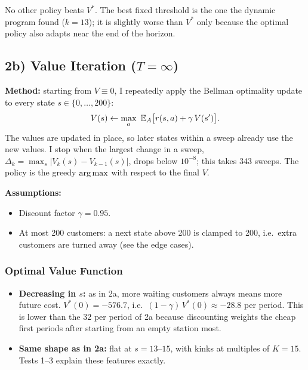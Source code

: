 
No other policy beats $V^*$. The best fixed threshold is the one the dynamic program found ($k = 13$); it is slightly worse than $V^*$ only because the optimal policy also adapts near the end of the horizon.

\FloatBarrier
\subsection{\texorpdfstring{2b) Value Iteration ($T = \infty$)}{2b) Value Iteration (infinite horizon)}}

\textbf{Method:} starting from $V \equiv 0$, I repeatedly apply the Bellman optimality update to every state $s \in \{0, \dots, 200\}$:
\[
  V(s) \leftarrow \max_{a}\ \mathbb{E}_{A}\big[r(s, a) + \gamma\,V(s')\big].
\]
The values are updated in place, so later states within a sweep already use the new values. I stop when the largest change in a sweep, $\Delta_k = \max_s |V_k(s) - V_{k-1}(s)|$, drops below $10^{-8}$; this takes 343 sweeps. The policy is the greedy $\operatorname*{arg\,max}$ with respect to the final $V$.

\textbf{Assumptions:}
\begin{itemize}
  \item Discount factor $\gamma = 0.95$.
  \item At most 200 customers: a next state above 200 is clamped to 200, i.e.\ extra customers are turned away (see the edge cases).
\end{itemize}

\subsubsection{Optimal Value Function}


\begin{itemize}
  \item \textbf{Decreasing in $s$:} as in 2a, more waiting customers always means more future cost. $V^*(0) = -576.7$, i.e.\ $(1 - \gamma)\,V^*(0) \approx -28.8$ per period. This is lower than the 32 per period of 2a because discounting weights the cheap first periods after starting from an empty station most.
  \item \textbf{Same shape as in 2a:} flat at $s = 13$--$15$, with kinks at multiples of $K = 15$. Tests 1--3 explain these features exactly.
\end{itemize}

